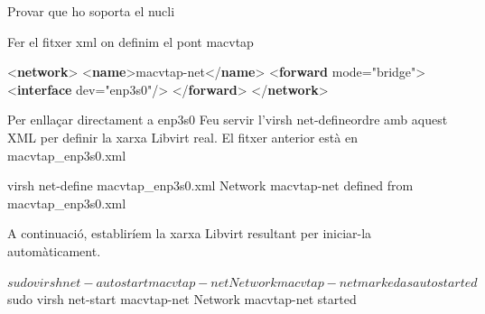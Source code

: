 \documentclass[
  10pt,
]{krantz}
\newenvironment{Shaded}{\begin{snugshade}}{\end{snugshade}}
\newcommand{\ExtensionTok}[1]{#1}
\newcommand{\FunctionTok}[1]{\textcolor[rgb]{0.00,0.00,0.00}{#1}}
\newcommand{\KeywordTok}[1]{\textcolor[rgb]{0.13,0.29,0.53}{\textbf{#1}}}
\newcommand{\NormalTok}[1]{#1}
\newcommand{\OtherTok}[1]{\textcolor[rgb]{0.56,0.35,0.01}{#1}}
\newcommand{\StringTok}[1]{\textcolor[rgb]{0.31,0.60,0.02}{#1}}
\begin{document}
Provar que ho soporta el nucli

\begin{Shaded}
\end{Shaded}

Fer el fitxer xml on definim el pont macvtap

\begin{Shaded}
\begin{Highlighting}[]
\NormalTok{\textless{}}\KeywordTok{network}\NormalTok{\textgreater{}}
\NormalTok{  \textless{}}\KeywordTok{name}\NormalTok{\textgreater{}macvtap{-}net\textless{}/}\KeywordTok{name}\NormalTok{\textgreater{}}
\NormalTok{  \textless{}}\KeywordTok{forward}\OtherTok{ mode=}\StringTok{"bridge"}\NormalTok{\textgreater{}}
\NormalTok{    \textless{}}\KeywordTok{interface}\OtherTok{ dev=}\StringTok{"enp3s0"}\NormalTok{/\textgreater{}}
\NormalTok{  \textless{}/}\KeywordTok{forward}\NormalTok{\textgreater{}}
\NormalTok{\textless{}/}\KeywordTok{network}\NormalTok{\textgreater{}}
\end{Highlighting}
\end{Shaded}

Per enllaçar directament a enp3s0 Feu servir l'virsh net-defineordre amb aquest XML per definir la xarxa Libvirt real. El fitxer anterior està en macvtap\_enp3s0.xml

\begin{Shaded}
\begin{Highlighting}[]
\ExtensionTok{virsh}\NormalTok{ net{-}define macvtap\_enp3s0.xml}
\ExtensionTok{Network}\NormalTok{ macvtap{-}net defined from macvtap\_enp3s0.xml}
\end{Highlighting}
\end{Shaded}

A continuació, establiríem la xarxa Libvirt resultant per iniciar-la automàticament.

\begin{Shaded}
\begin{Highlighting}[]
\ExtensionTok{$}\NormalTok{ sudo virsh net{-}autostart macvtap{-}net}
\ExtensionTok{Network}\NormalTok{ macvtap{-}net marked as autostarted}
\ExtensionTok{$}\NormalTok{ sudo virsh net{-}start macvtap{-}net}
\ExtensionTok{Network}\NormalTok{ macvtap{-}net started}
\end{Highlighting}
\end{Shaded}
\end{document}
